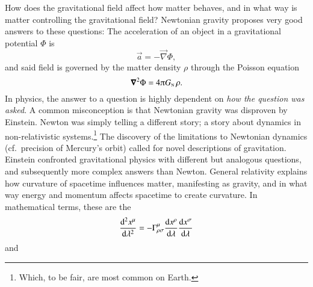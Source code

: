 










How does the gravitational field affect how matter behaves, and in what way is matter controlling the gravitational field? Newtonian gravity proposes very good answers to these questions: The acceleration of an object in a gravitational potential $\Phi$ is
\begin{equation}
    \vec{a} = -\vec{\nabla} \Phi,
\end{equation}
and said field is governed by the matter density $\rho$ through the Poisson equation
\begin{equation}
    \vec{\nabla}^2\Phi =  4 \ppi G\nped{N} \,\rho.
\end{equation}
In physics, the answer to a question is highly dependent on \emph{how the question was asked}.
A common misconception is that Newtonian gravity was disproven by Einstein.  
Newton was simply telling a different story; a story about dynamics in non-relativistic systems.\footnote{Which, to be fair, are most common on Earth.} %
The discovery of the limitations to Newtonian dynamics (cf.~precision of Mercury's orbit) called for novel descriptions of gravitation. 
Einstein confronted gravitational physics with different but analogous questions, and subsequently more complex answers than Newton. General relativity explains how curvature of spacetime influences matter, manifesting as gravity, and in what way energy and momentum affects spacetime to create curvature. %
In mathematical terms, these are the 
\begin{equation}
    \dv[2]{x\^\mu}{\lambda} = - \Gamma\indices*{^\mu_{\rho\sigma}} \dv{x\^\rho}{\lambda} \dv{x\^\sigma}{\lambda}
\end{equation}
and 
